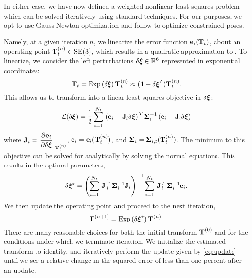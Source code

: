  In either case, we have now defined a weighted nonlinear least squares problem which can be solved iteratively using
standard techniques. For our purposes, we opt to use Gauss-Newton optimization and follow \cite{Barfoot2017-ri} to optimize constrained poses.

Namely, at a given iteration $n$, we linearize the error function $\boldsymbol{\mathbf{e}}_{i}(\boldsymbol{\mathbf{T}}_t)$, about an operating point $\boldsymbol{\mathbf{T}}_t^{(n)} \in \mathrm{SE}(3)$, which results in a quadratic approximation to . To linearize, we consider the left perturbations $\delta\Vector{\xi}\in\RealNumbers[6]$ represented in exponential
coordinates:
\begin{equation}
  \boldsymbol{\mathbf{T}}_t = \mathrm{Exp}\left({\delta\boldsymbol{\mathbf{\xi}}}\right) \boldsymbol{\mathbf{T}}_t^{(n)} \approx (\boldsymbol{\mathbf{1}} + \delta\boldsymbol{\mathbf{\xi}}^{\wedge}) \boldsymbol{\mathbf{T}}_t^{(n)}.
\end{equation}
This allows us to transform  into a linear least squares objective in $\delta\boldsymbol{\mathbf{\xi}}$:
\begin{equation}
\label{eq:vo_linleastsquares}
  \mathcal{L}(\delta \boldsymbol{\mathbf{\xi}}) = \frac{1}{2}\sum_{i=1}^{N_t} 
  \left.{\left(\boldsymbol{\mathbf{e}}_{i}
  - \boldsymbol{\mathbf{J}}_{i} \delta\boldsymbol{\mathbf{\xi}}\right)}\right.^T
\boldsymbol{\mathbf{\Sigma}}_{i}^{-1}
 \left(\boldsymbol{\mathbf{e}}_{i}
 - \boldsymbol{\mathbf{J}}_{i} \delta\boldsymbol{\mathbf{\xi}}\right)
  \end{equation}
where $\boldsymbol{\mathbf{J}}_{i} = \left.\dfrac{\partial \boldsymbol{\mathbf{e}}_i}{\partial \delta \boldsymbol{\mathbf{\xi}}}\right|_{\boldsymbol{\mathbf{T}}_t^{(n)}}$, $\boldsymbol{\mathbf{e}}_{i} = \boldsymbol{\mathbf{e}}_{i}(\boldsymbol{\mathbf{T}}_t^{(n)})$, and $\boldsymbol{\mathbf{\Sigma}}_{i} =  \boldsymbol{\mathbf{\Sigma}}_{i,t}(\boldsymbol{\mathbf{T}}_t^{(n)})$. 
The minimum to this objective can be solved for analytically by solving the normal equations. This results in the optimal parameters,  
\begin{equation}
  \delta\boldsymbol{\mathbf{\xi}}^{\star} = 
  \left( \sum_{i=1}^{N_t} \left.{\boldsymbol{\mathbf{J}}}\right.^T_{i}
  \boldsymbol{\mathbf{\Sigma}}_{i}^{-1} \boldsymbol{\mathbf{J}}_{i} \right)^{-1}
  \sum_{i=1}^{N_t} \left.{\boldsymbol{\mathbf{J}}}\right.^T_{i}
  \boldsymbol{\mathbf{\Sigma}}_{i}^{-1} \boldsymbol{\mathbf{e}}_{i}. 
\label{eq:least-squares-iteration}
\end{equation}
We then update the operating point and proceed to the next iteration,
\begin{equation}
  \boldsymbol{\mathbf{T}}^{(n+1)} = \mathrm{Exp}\left({\delta\boldsymbol{\mathbf{\xi}}^{\star}}\right) \boldsymbol{\mathbf{T}}^{(n)}. \label{eq:update}
\end{equation}
There are many reasonable choices for both the initial transform
$\boldsymbol{\mathbf{T}}^{(0)}$ and for the conditions under which we terminate
iteration. We initialize the estimated transform to identity, and iteratively
perform the update given by \cref{eq:update} until we see a relative change in
the squared error of less than one percent after an update. 

